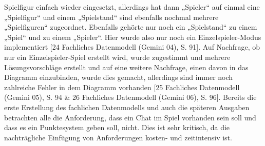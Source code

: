 Spielfigur einfach wieder eingesetzt, allerdings hat dann „Spieler“ auf einmal eine „Spielfigur“ und einem „Spielstand“ sind 
ebenfalls nochmal mehrere „Spielfiguren“ zugeordnet. Ebenfalls gehörte nur noch ein „Spielstand“ zu einem „Spiel“ und zu einem 
„Spieler“. Hier wurde also nur noch ein Einzelspieler-Modus implementiert [24 Fachliches Datenmodell (Gemini 04), S. 91]. Auf 
Nachfrage, ob nur ein Einzelspieler-Spiel erstellt wird, wurde zugestimmt und mehrere Lösungsvorschläge erstellt und auf eine 
weitere Nachfrage, einen davon in das Diagramm einzubinden, wurde dies gemacht, allerdings sind immer noch zahlreiche Fehler 
in dem Diagramm vorhanden [25 Fachliches Datenmodell (Gemini 05), S. 94 \& 26 Fachliches Datenmodell (Gemini 06), S. 96]. Bereits 
die erste Erstellung des fachlichen Datenmodells und auch die späteren Ausgaben betrachten alle die Anforderung, dass ein Chat 
im Spiel vorhanden sein soll und dass es ein Punktesystem geben soll, nicht. Dies ist sehr kritisch, da die nachträgliche Einfügung 
von Anforderungen kosten- und zeitintensiv ist.

